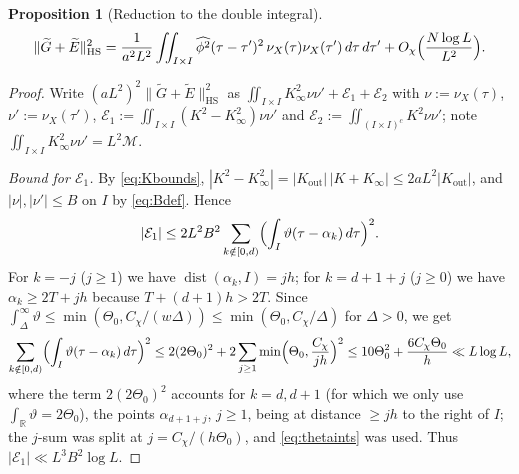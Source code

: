 \documentclass[11pt]{amsart}
\newtheorem{proposition}[theorem]{Proposition}
\theoremstyle{definition}
\theoremstyle{remark}
\numberwithin{equation}{section}
\DeclareMathOperator{\dist}{dist}
\newcommand{\RR}{\mathbb{R}}
\newcommand{\wh}{\widehat}
\newcommand{\Gt}{\widetilde{G}}
\newcommand{\Et}{\widetilde{E}}
\newcommand{\dd}{\,d}
\newcommand{\HS}{\mathrm{HS}}
\begin{document}
\begin{proposition}[Reduction to the double integral]\label{prop:reduction}
\[
\|\Gt+\Et\|_{\HS}^2=\frac1{a^2L^2}\iint_{I\times I}\wh{\phi^2}(\tau-\tau')^2\,\nu_X(\tau)\nu_X(\tau')\dd\tau\dd\tau'+O_\chi\Bigl(\frac{N\log L}{L^2}\Bigr).
\]
\end{proposition}
\begin{proof}
Write $(aL^2)^2\|\Gt+\Et\|_{\HS}^2$ as $\iint_{I\times I}K_\infty^2\nu\nu'+\mathcal E_1+\mathcal E_2$ with $\nu:=\nu_X(\tau)$, $\nu':=\nu_X(\tau')$,
$\mathcal E_1:=\iint_{I\times I}(K^2-K_\infty^2)\nu\nu'$ and $\mathcal E_2:=\iint_{(I\times I)^c}K^2\nu\nu'$; note $\iint_{I\times I}K_\infty^2\nu\nu'=L^2\mathcal M$.

\emph{Bound for $\mathcal E_1$.} By \eqref{eq:Kbounds}, $|K^2-K_\infty^2|=|K_{\mathrm{out}}|\,|K+K_\infty|\le2aL^2|K_{\mathrm{out}}|$, and $|\nu|,|\nu'|\le B$ on $I$ by \eqref{eq:Bdef}. Hence
\[
|\mathcal E_1|\le2L^2B^2\sum_{k\notin[0,d)}\Bigl(\int_I\vartheta(\tau-\alpha_k)\dd\tau\Bigr)^2 .
\]
For $k=-j$ ($j\ge1$) we have $\dist(\alpha_k,I)=jh$; for $k=d+1+j$ ($j\ge0$) we have $\alpha_k\ge2T+jh$ because $T+(d+1)h>2T$. Since $\int_{\Delta}^\infty\vartheta\le\min(\Theta_0,C_\chi/(w\Delta))\le\min(\Theta_0,C_\chi/\Delta)$ for $\Delta>0$, we get
\[
\sum_{k\notin[0,d)}\Bigl(\int_I\vartheta(\tau-\alpha_k)\dd\tau\Bigr)^2\le 2(2\Theta_0)^2+2\sum_{j\ge1}\min\Bigl(\Theta_0,\frac{C_\chi}{jh}\Bigr)^2\le 10\Theta_0^2+\frac{6C_\chi\Theta_0}{h}\ll L\log L,
\]
where the term $2(2\Theta_0)^2$ accounts for $k=d,d+1$ (for which we only use $\int_\RR\vartheta=2\Theta_0$), the points $\alpha_{d+1+j}$, $j\ge1$, being at distance $\ge jh$ to the right of $I$; the $j$-sum was split at $j=C_\chi/(h\Theta_0)$, and \eqref{eq:thetaints} was used. Thus $|\mathcal E_1|\ll L^3B^2\log L$.


\end{proof}
\end{document}
